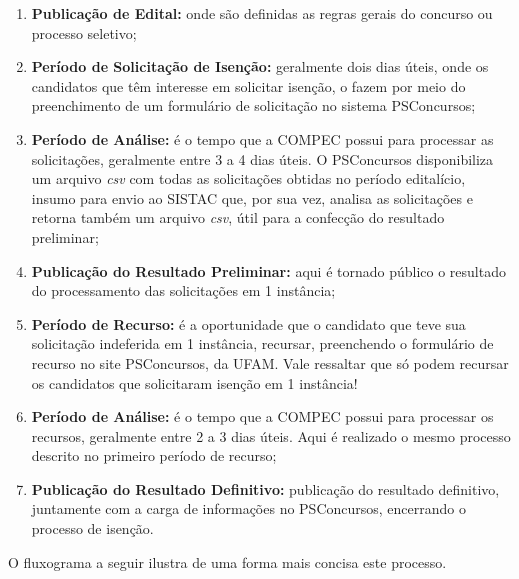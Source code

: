 \documentclass[
	12pt,			%
	openright,		%
	oneside,	
	a4paper,		%
	english,		%
	brazil			%
]{abntex2/abntex2}  %
\begin{document}
			\begin{enumerate}
				
				\item \textbf{Publicação de Edital:} onde são definidas as regras gerais do concurso ou processo seletivo;
				\item \textbf{Período de Solicitação de Isenção:} geralmente dois dias úteis, onde os candidatos que têm interesse em solicitar isenção, o fazem por meio do preenchimento de um formulário de solicitação no sistema PSConcursos;
				\item \textbf{Período de Análise:} é o tempo que a COMPEC possui para processar as solicitações, geralmente entre 3 a 4 dias úteis. O PSConcursos disponibiliza um arquivo \textit{csv} com todas as solicitações obtidas no período editalício, insumo para envio ao SISTAC que, por sua vez, analisa as solicitações e retorna também um arquivo \textit{csv}, útil para a confecção do resultado preliminar;
				\item \textbf{Publicação do Resultado Preliminar:} aqui é tornado público o resultado do processamento das solicitações em 1{\textordfeminine} instância;
				\item \textbf{Período de Recurso:} é a oportunidade que o candidato que teve sua solicitação indeferida em 1{\textordfeminine} instância, recursar, preenchendo o formulário de recurso no site PSConcursos, da UFAM. Vale ressaltar que só podem recursar os candidatos que solicitaram isenção em 1{\textordfeminine} instância!
				\item \textbf{Período de Análise:} é o tempo que a COMPEC possui para processar os recursos, geralmente entre 2 a 3 dias úteis. Aqui é realizado o mesmo processo descrito no primeiro período de recurso;
				\item \textbf{Publicação do Resultado Definitivo:} publicação do resultado definitivo, juntamente com a carga de informações no PSConcursos, encerrando o processo de isenção.
				
			\end{enumerate}
			
			O fluxograma a seguir ilustra de uma forma mais concisa este processo.
			
\end{document}

